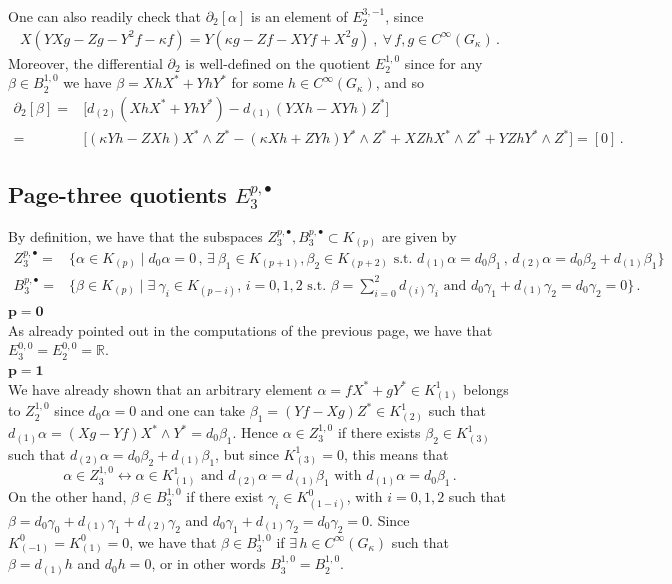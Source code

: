 \documentclass[10pt]{amsart}
\theoremstyle{remark}
\numberwithin{equation}{section}
\begin{document}
One can also readily check that $\partial_2[\alpha]$ is an element of $E_2^{3,-1}$, since
\begin{align*}
    X(YXg-Zg-Y^2f-\kappa f)=Y(\kappa g-Zf-XYf+X^2g)\ ,\ \forall\, f,g\in C^\infty(G_\kappa)\,.
\end{align*}
Moreover, the differential $\partial_2$ is well-defined on the quotient $E_2^{1,0}$ since for any $\beta\in B_2^{1,0}$ we have $\beta=XhX^\ast+YhY^\ast$ for some $h\in C^\infty(G_\kappa)$, and so
\begin{align*}
    \partial_2[\beta]=&\big[d_{(2)}(XhX^\ast+YhY^\ast)-d_{(1)}(YXh-XYh)Z^\ast\big]\\
    =&\big[(\kappa Yh-ZXh)X^\ast\wedge Z^\ast-(\kappa Xh+ZYh)Y^\ast\wedge Z^\ast+XZhX^\ast\wedge Z^\ast+YZhY^\ast\wedge Z^\ast\big]=[0]\,.
\end{align*}
\subsection{Page-three quotients $E_3^{p,\bullet}$} By definition, we have that the subspaces $Z_3^{p,\bullet},B_3^{p,\bullet}\subset K_{(p)}$ are given by
\begin{align*}
    Z_3^{p,\bullet}=&\lbrace\alpha\in K_{(p)}\mid d_0\alpha=0\,,\,\exists\ \beta_1\in K_{(p+1)},\beta_2\in K_{(p+2)}\text{ s.t. }d_{(1)}\alpha=d_0\beta_1\,,\,d_{(2)}\alpha=d_0\beta_2+d_{(1)}\beta_1\rbrace\\
    B_3^{p,\bullet}=&\lbrace\beta\in K_{(p)}\mid \exists\ \gamma_i\in K_{(p-i)},\, i=0,1,2\text{ s.t. }\beta=\sum_{i=0}^2d_{(i)}\gamma_i\text{ and }d_0\gamma_1+d_{(1)}\gamma_2=d_0\gamma_2=0\rbrace\,.
\end{align*}
$\mathbf{p=0}$\\
As already pointed out in the computations of the previous page, we have that $E^{0,0}_3=E^{0,0}_2=\mathbb{R}$.\\
$\mathbf{p=1}$\\
We have already shown that an arbitrary element $\alpha=fX^\ast+gY^\ast\in K_{(1)}^1$ belongs to $Z^{1,0}_2$ since $d_0\alpha=0$ and one can take $\beta_1=(Yf-Xg)Z^\ast\in K_{(2)}^1$ such that $d_{(1)}\alpha=(Xg-Yf)X^\ast\wedge Y^\ast=d_0\beta_1$. Hence $\alpha\in Z^{1,0}_3$ if there exists $\beta_2\in K_{(3)}^1$ such that $d_{(2)}\alpha=d_0\beta_2+d_{(1)}\beta_1$, but since $K_{(3)}^1=0$, this means that $$\alpha\in Z^{1,0}_3\longleftrightarrow \alpha\in K_{(1)}^1\text{ and }d_{(2)}\alpha=d_{(1)}\beta_1\text{ with }d_{(1)}\alpha=d_{0}\beta_1\,.$$
On the other hand, $\beta\in B_3^{1,0}$ if there exist $\gamma_i\in K_{(1-i)}^0$, with $i=0,1,2$ such that $\beta=d_0\gamma_0+d_{(1)}\gamma_1+d_{(2)}\gamma_2$ and $d_0\gamma_1+d_{(1)}\gamma_2=d_0\gamma_2=0$. Since $K_{(-1)}^0=K_{(1)}^0=0$, we have that $\beta\in B_3^{1,0}$ if $\exists\, h\in C^\infty(G_\kappa)$ such that $\beta=d_{(1)}h$ and $d_0h=0$, or in other words $B_3^{1,0}=B_2^{1,0}$.\\
\end{document}
